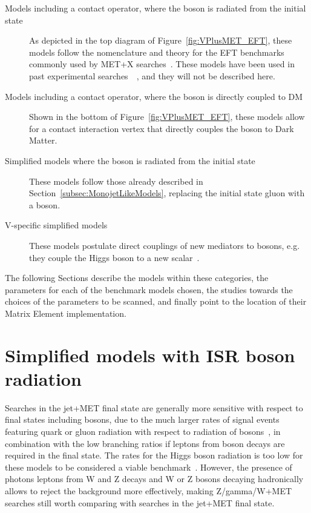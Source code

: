 \begin{description}
 \item[Models including a contact operator, where the boson is radiated from the initial state] As depicted in 
 the top diagram of Figure~\ref{fig:VPlusMET_EFT}, these models follow the nomenclature and theory 
 for the EFT benchmarks commonly used by MET+X searches~\cite{Goodman:2010ku}. These models
 have been used in past experimental searches~~\cite{Khachatryan:2014rwa, Aad:2014vka,Khachatryan:2014tva, Aad:2014vka, 
 ATLAS:2014wra, Aad:2013oja}, and they will not be described here. 
 \item[Models including a contact operator, where the boson is directly coupled to DM]
 Shown in the bottom of Figure~\ref{fig:VPlusMET_EFT},
 these models allow for a contact interaction vertex that directly couples the boson to Dark Matter. 
 \item[Simplified models where the boson is radiated from the initial state] These models follow those
 already described in Section~\ref{subsec:MonojetLikeModels}, replacing the initial state gluon with a boson.
 \item[V-specific simplified models] These models postulate direct couplings of new mediators
 to bosons, e.g. they couple the Higgs boson to a new scalar~\cite{Carpenter:2013xra}. 
\end{description}

The following Sections describe the models within these categories, 
the parameters for each of the benchmark models chosen,
the studies towards the choices of the parameters to be scanned, 
and finally point to the location of their Matrix Element 
implementation. 

\section{Simplified models with ISR boson radiation}

Searches in the jet+MET final state are generally more sensitive
with respect to final states including bosons, due to the much 
larger rates of signal events featuring quark or gluon radiation with 
respect to radiation of bosons~\cite{Zhou:2013fla}, 
in combination with the low branching ratios if leptons from 
boson decays are required in the final state. 
The rates for the Higgs boson radiation is too low for these models 
to be considered a viable benchmark~\cite{Carpenter:2013xra}.
However, the presence of photons
leptons from W and Z decays
and W or Z bosons decaying hadronically
allows to reject the background more effectively, making Z/gamma/W+MET searches 
still worth comparing with searches in the jet+MET final state. 

